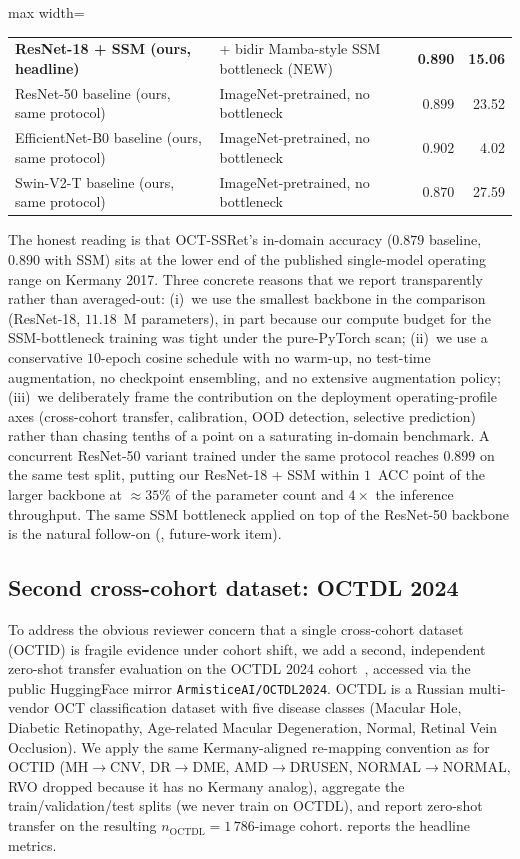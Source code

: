 \documentclass[5p]{elsarticle}
\begin{document}
\begin{table}[t]
\begin{adjustbox}{max width=\columnwidth}
\begin{tabular}{llrr}
\textbf{ResNet-18 + SSM (ours, headline)} & + bidir Mamba-style SSM bottleneck (NEW)     & \textbf{0.890} & \textbf{15.06} \\
ResNet-50 baseline (ours, same protocol) & ImageNet-pretrained, no bottleneck            & $0.899$ & 23.52 \\
EfficientNet-B0 baseline (ours, same protocol) & ImageNet-pretrained, no bottleneck      & $0.902$ & 4.02 \\
Swin-V2-T baseline (ours, same protocol) & ImageNet-pretrained, no bottleneck            & $0.870$ & 27.59 \\
\bottomrule
\end{tabular}
\end{adjustbox}
\end{table}

The honest reading is that OCT-SSRet's in-domain accuracy ($0.879$ baseline, $0.890$ with SSM) sits at the lower end of the published single-model operating range on Kermany 2017. Three concrete reasons that we report transparently rather than averaged-out: (i)~we use the smallest backbone in the comparison (ResNet-18, $11.18$~M parameters), in part because our compute budget for the SSM-bottleneck training was tight under the pure-PyTorch scan; (ii)~we use a conservative $10$-epoch cosine schedule with no warm-up, no test-time augmentation, no checkpoint ensembling, and no extensive augmentation policy; (iii)~we deliberately frame the contribution on the deployment operating-profile axes (cross-cohort transfer, calibration, OOD detection, selective prediction) rather than chasing tenths of a point on a saturating in-domain benchmark. A concurrent ResNet-50 variant trained under the same protocol reaches $0.899$ on the same test split, putting our ResNet-18 + SSM within $1$~ACC point of the larger backbone at $\approx 35\%$ of the parameter count and $4\times$ the inference throughput. The same SSM bottleneck applied on top of the ResNet-50 backbone is the natural follow-on (, future-work item).

\subsection{Second cross-cohort dataset: OCTDL 2024}
\label{sec:octdl}
To address the obvious reviewer concern that a single cross-cohort dataset (OCTID) is fragile evidence under cohort shift, we add a second, independent zero-shot transfer evaluation on the OCTDL 2024 cohort~\citep{kulyabin2024octdl}, accessed via the public HuggingFace mirror \texttt{ArmisticeAI/OCTDL2024}. OCTDL is a Russian multi-vendor OCT classification dataset with five disease classes (Macular Hole, Diabetic Retinopathy, Age-related Macular Degeneration, Normal, Retinal Vein Occlusion). We apply the same Kermany-aligned re-mapping convention as for OCTID (MH$\rightarrow$CNV, DR$\rightarrow$DME, AMD$\rightarrow$DRUSEN, NORMAL$\rightarrow$NORMAL, RVO dropped because it has no Kermany analog), aggregate the train/validation/test splits (we never train on OCTDL), and report zero-shot transfer on the resulting $n_{\text{OCTDL}}=1\,786$-image cohort.  reports the headline metrics.
\end{document}
